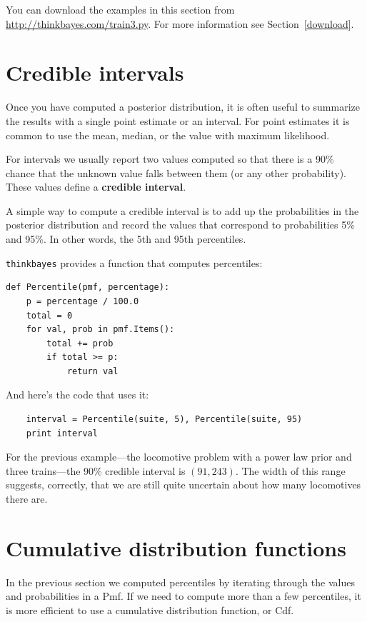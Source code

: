 \documentclass[12pt]{book}
\begin{document}
You can download the examples in this section from
\url{http://thinkbayes.com/train3.py}.
  For more information
see Section~\ref{download}.

\section{Credible intervals}
\label{credible}

Once you have computed a posterior distribution, it is often useful
to summarize the results with a single point estimate or an interval.
For point estimates it is common to use the mean, median, or the
value with maximum likelihood.

For intervals we usually report two values computed
so that there is a 90\% chance that the unknown value falls
between them (or any other probability).
These values define a {\bf credible interval}.

A simple way to compute a credible interval is to add up the
probabilities in the posterior distribution and record the values
that correspond to probabilities 5\% and 95\%.  In other words,
the 5th and 95th percentiles.

\verb"thinkbayes" provides a function that computes percentiles:

\begin{verbatim}
def Percentile(pmf, percentage):
    p = percentage / 100.0
    total = 0
    for val, prob in pmf.Items():
        total += prob
        if total >= p:
            return val    
\end{verbatim}

And here's the code that uses it:

\begin{verbatim}
    interval = Percentile(suite, 5), Percentile(suite, 95)
    print interval
\end{verbatim}

For the previous example---the locomotive problem with a power law prior
and three trains---the 90\% credible interval is $(91, 243)$.  The
width of this range suggests, correctly, that we are still quite
uncertain about how many locomotives there are.


\section{Cumulative distribution functions}

In the previous section we computed percentiles by iterating through
the values and probabilities in a Pmf.  If we need to compute more
than a few percentiles, it is more efficient to use a cumulative
distribution function, or Cdf.
\end{document}
